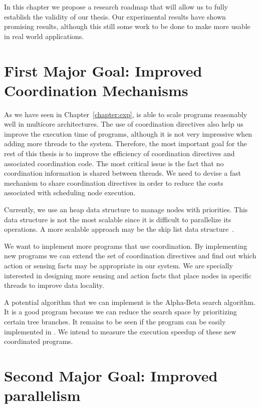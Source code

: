 
In this chapter we propose a research roadmap that will allow us to fully establish the validity of our thesis.
Our experimental results have shown promising results, although this still some work to be done to make
\lang more usable in real world applications.

\section{First Major Goal: Improved Coordination Mechanisms}

As we have seen in Chapter~\ref{chapter:exp}, \lang is able to scale programs reasonably well
in multicore architectures.
The use of coordination directives also help us improve the execution time of programs, although it is not very impressive
when adding more threads to the system. Therefore, the most important goal for the rest of this thesis is to improve the
efficiency of coordination directives and associated coordination code. The most critical issue is the fact that no
coordination information is shared between threads. We need to devise a fast mechanism to share coordination directives
in order to reduce the costs associated with scheduling node execution.

Currently, we use an heap data structure to manage nodes with priorities. This data structure is not the most scalable since it is difficult to parallelize its operations.
A more scalable approach may be the skip list data structure~\cite{Sundell:2005:FLC:1073765.1073770}.

We want to implement more programs that use coordination. By implementing new programs we can
extend the set of coordination directives and find out which action or sensing facts may be
appropriate in our system. We are specially interested in designing more sensing and action
facts that place nodes in specific threads to improve data locality.

A potential algorithm that we can implement is the Alpha-Beta search algorithm. It is a good program
because we can reduce the search space by prioritizing certain tree branches. It remains to be
seen if the program can be easily implemented in \lang.
We intend to measure the execution speedup of these new coordinated programs.

\section{Second Major Goal: Improved parallelism}

